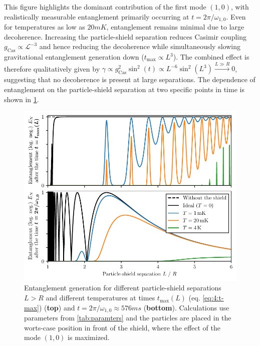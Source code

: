 This figure highlights the dominant contribution of the first mode $(1,0)$, with realistically measurable entanglement primarily occurring at $t = 2 \pi/\omega_{1,0}$.
Even for temperatures as low as $20\si{mK}$, entanglement remains minimal due to large decoherence.
Increasing the particle-shield separation reduces Casimir coupling $g_\mathrm{Cas} \propto \mathscr{L}^{-3}$ and hence reducing the decoherence while simultaneously slowing gravitational entanglement generation down ($t_\mathrm{max} \propto L^3$).
The combined effect is therefore qualitatively given by $\gamma \propto g_\mathrm{Cas}^2 \sin^2(t) \propto L^{-6} \sin^2(L^3) \xrightarrow{L \gg R} 0$, suggesting that no decoherence is present at large separations.
The dependence of entanglement on the particle-shield separation at two specific points in time is shown in \cref{fig:5:entanglement-thermal-shield-L}.
\begin{figure}[!htbp]
  \centering
  \includegraphics[width=\textwidth]{./../figures/vibrations/all-modes-entanglement-L.pdf}
  \caption{Entanglement generation for different particle-shield separations $L > R$ and different temperatures at times $t_\mathrm{max}(L)$ (eq. \eqref{eq:4:t-max}) (\textbf{top}) and $t = 2\pi/\omega_{1,0}\approx 576\si{ms}$ (\textbf{bottom}). Calculations use parameters from \cref{tab:paramters} and the particles are placed in the worts-case position in front of the shield, where the effect of the mode $(1,0)$ is maximized.}
  \label{fig:5:entanglement-thermal-shield-L}
\end{figure}

